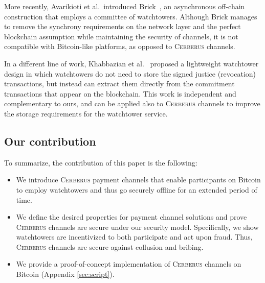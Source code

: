 \documentclass[runningheads]{llncs}
\newcommand{\authnote}[3]{{ \footnotesize \bf{#1[#2: #3]~}}} %
\newcommand{\edit}[1]{\authnote{\color{blue}}{edit}{#1}}
\newcommand{\sys}{\textsc{Cerberus}\xspace}
\begin{document}
More recently, Avarikioti et al.\ introduced Brick~\cite{avarikioti2019brick}, an asynchronous off-chain construction that employs a committee of watchtowers. Although Brick manages to remove the synchrony requirements on the network layer and the perfect blockchain assumption while maintaining the security of channels, it is not compatible with Bitcoin-like platforms, as opposed to \sys channels.

In a different line of work, Khabbazian  et al.~\cite{khabbazian2019outpost} proposed a lightweight watchtower design in which watchtowers do not need to store the signed justice (revocation) transactions, but instead can extract them  directly from the commitment transactions that appear on the blockchain.
This work is independent and complementary to ours, and can be applied also to \sys channels to improve the storage requirements for the watchtower service.

\subsection{Our contribution} To summarize, the contribution of this paper is the following:
\begin{itemize}

    \item We introduce \sys payment channels that
enable participants on Bitcoin to employ watchtowers and thus go securely offline for an extended period of time.
    \item We define the desired properties for payment channel solutions and prove \sys channels are secure under our security model. Specifically, we show  watchtowers are incentivized to both participate and act upon fraud. Thus, \sys channels are secure against collusion and bribing.
    \item We provide a proof-of-concept implementation of \sys channels on Bitcoin (Appendix \ref{sec:script}).
\end{itemize}
\end{document}
